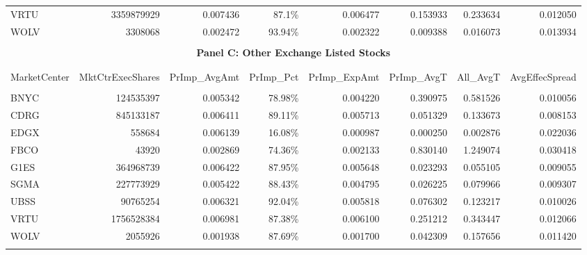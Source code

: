 \documentclass[12pt,a4paper]{article}
\begin{document}
\begin{table}
\begin{tabular}{@{}lrrrrrrr@{}}
				VRTU &        3359879929 &      0.007436 &     87.1\% &      0.006477 &    0.153933 &  0.233634 &        0.012050 \\
				WOLV &           3308068 &      0.002472 &    93.94\% &      0.002322 &    0.009388 &  0.016073 &        0.013934 \\
				\hline \\[-2ex] 
				\multicolumn{8}{c}{\textbf{Panel C: Other Exchange Listed Stocks}} \\ \\[-2.5ex] 
				\hline \\[-1.8ex] 
				MarketCenter &  MktCtrExecShares &  PrImp\_AvgAmt & PrImp\_Pct &  PrImp\_ExpAmt &  PrImp\_AvgT &  All\_AvgT &  AvgEffecSpread \\
				\hline \\[-1.8ex] 
				BNYC &         124535397 &      0.005342 &    78.98\% &      0.004220 &    0.390975 &  0.581526 &        0.010056 \\
				CDRG &         845133187 &      0.006411 &    89.11\% &      0.005713 &    0.051329 &  0.133673 &        0.008153 \\
				EDGX &            558684 &      0.006139 &    16.08\% &      0.000987 &    0.000250 &  0.002876 &        0.022036 \\
				FBCO &             43920 &      0.002869 &    74.36\% &      0.002133 &    0.830140 &  1.249074 &        0.030418 \\
				G1ES &         364968739 &      0.006422 &    87.95\% &      0.005648 &    0.023293 &  0.055105 &        0.009055 \\
				SGMA &         227773929 &      0.005422 &    88.43\% &      0.004795 &    0.026225 &  0.079966 &        0.009307 \\
				UBSS &          90765254 &      0.006321 &    92.04\% &      0.005818 &    0.076302 &  0.123217 &        0.010026 \\
				VRTU &        1756528384 &      0.006981 &    87.38\% &      0.006100 &    0.251212 &  0.343447 &        0.012066 \\
				WOLV &           2055926 &      0.001938 &    87.69\% &      0.001700 &    0.042309 &  0.157656 &        0.011420 \\
				\hline \\[-2ex] 
			\end{tabular}

		
		
		\end{table}

		\restoregeometry
	
\end{document}
